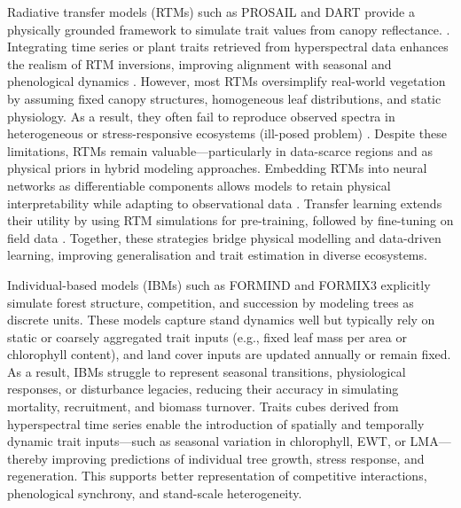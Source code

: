 \documentclass[pdflatex,sn-mathphys-num]{sn-jnl}%
\theoremstyle{thmstyleone}%
\theoremstyle{thmstyletwo}%
\theoremstyle{thmstylethree}%
\begin{document}
Radiative transfer models (RTMs) such as PROSAIL \cite{jacquemoud2009prospect+} and DART \cite{gastellu2004dart} provide a physically grounded framework to simulate trait values from canopy reflectance.
. Integrating time series or plant traits retrieved from hyperspectral data enhances the realism of RTM inversions, improving alignment with seasonal and phenological dynamics \cite{verrelst2019quantifying,mederer2025plant}. However, most RTMs oversimplify real-world vegetation by assuming fixed canopy structures, homogeneous leaf distributions, and static physiology. As a result, they often fail to reproduce observed spectra in heterogeneous or stress-responsive ecosystems (ill-posed problem) \cite{kattenborn2019radiative,ali2021machine}. Despite these limitations, RTMs remain valuable—particularly in data-scarce regions and as physical priors in hybrid modeling approaches. Embedding RTMs into neural networks as differentiable components allows models to retain physical interpretability while adapting to observational data \cite{sun5107112bridging,she2024spectra}. Transfer learning extends their utility by using RTM simulations for pre-training, followed by fine-tuning on field data \cite{zhang2021domain}. Together, these strategies bridge physical modelling and data-driven learning, improving generalisation and trait estimation in diverse ecosystems.


Individual-based models (IBMs) such as FORMIND \cite{kohler1998effects} and FORMIX3 \cite{huth1998rain} explicitly simulate forest structure, competition, and succession by modeling trees as discrete units. These models capture stand dynamics well but typically rely on static or coarsely aggregated trait inputs (e.g., fixed leaf mass per area or chlorophyll content), and land cover inputs are updated annually or remain fixed. As a result, IBMs struggle to represent seasonal transitions, physiological responses, or disturbance legacies, reducing their accuracy in simulating mortality, recruitment, and biomass turnover. Traits cubes derived from hyperspectral time series enable the introduction of spatially and temporally dynamic trait inputs—such as seasonal variation in chlorophyll, EWT, or LMA—thereby improving predictions of individual tree growth, stress response, and regeneration. This supports better representation of competitive interactions, phenological synchrony, and stand-scale heterogeneity.
\end{document}
